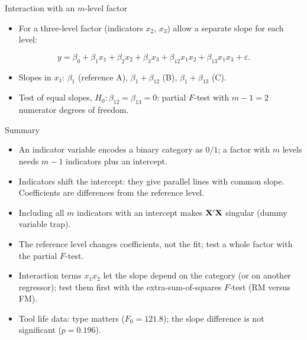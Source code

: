 \begin{frame}{Interaction with an $m$-level factor}
    \begin{itemize}
        \item For a three-level factor (indicators $x_2$, $x_3$) allow a separate slope for each level:
    \end{itemize}
    \[
        y = \beta_0 + \beta_1 x_1 + \beta_2 x_2 + \beta_3 x_3 + \beta_{12} x_1 x_2 + \beta_{13} x_1 x_3 + \varepsilon .
    \]
    \begin{itemize}
        \item Slopes in $x_1$: $\beta_1$ (reference A), $\beta_1 + \beta_{12}$ (B), $\beta_1 + \beta_{13}$ (C).
        \item Test of equal slopes, $H_0\colon \beta_{12} = \beta_{13} = 0$: partial $F$-test with $m - 1 = 2$ numerator degrees of freedom.
    \end{itemize}
\end{frame}


\begin{frame}{Summary}
    \begin{itemize}
        \item An indicator variable encodes a binary category as $0/1$; a factor with $m$ levels needs $m-1$ indicators plus an intercept.
        \item Indicators shift the intercept: they give parallel lines with common slope. Coefficients are differences from the reference level.
        \item Including all $m$ indicators with an intercept makes $\mathbf{X}' \mathbf{X}$ singular (dummy variable trap).
        \item The reference level changes coefficients, not the fit; test a whole factor with the partial $F$-test.
        \item Interaction terms $x_1 x_2$ let the slope depend on the category (or on another regressor); test them first with the extra-sum-of-squares $F$-test (RM versus FM).
        \item Tool life data: type matters ($F_0 = 121.8$); the slope difference is not significant ($p = 0.196$).
    \end{itemize}
\end{frame}